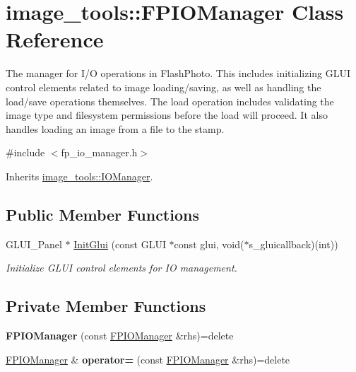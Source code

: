 \hypertarget{classimage__tools_1_1FPIOManager}{}\section{image\+\_\+tools\+:\+:F\+P\+I\+O\+Manager Class Reference}
\label{classimage__tools_1_1FPIOManager}


The manager for I/O operations in Flash\+Photo. This includes initializing G\+L\+UI control elements related to image loading/saving, as well as handling the load/save operations themselves. The load operation includes validating the image type and filesystem permissions before the load will proceed. It also handles loading an image from a file to the stamp.  




{\ttfamily \#include $<$fp\+\_\+io\+\_\+manager.\+h$>$}



Inherits \hyperlink{classimage__tools_1_1IOManager}{image\+\_\+tools\+::\+I\+O\+Manager}.

\subsection*{Public Member Functions}
\begin{DoxyCompactItemize}
\item 
G\+L\+U\+I\+\_\+\+Panel $\ast$ \hyperlink{classimage__tools_1_1FPIOManager_a813e5d68b47dcf703fbde9b4afa9aa8c}{Init\+Glui} (const G\+L\+UI $\ast$const glui, void($\ast$s\+\_\+gluicallback)(int))
\begin{DoxyCompactList}\small\item\em Initialize G\+L\+UI control elements for IO management. \end{DoxyCompactList}\end{DoxyCompactItemize}
\subsection*{Private Member Functions}
\begin{DoxyCompactItemize}
\item 
{\bfseries F\+P\+I\+O\+Manager} (const \hyperlink{classimage__tools_1_1FPIOManager}{F\+P\+I\+O\+Manager} \&rhs)=delete\hypertarget{classimage__tools_1_1FPIOManager_aa30c5ba2dc73be335b9607e05320eb27}{}\label{classimage__tools_1_1FPIOManager_aa30c5ba2dc73be335b9607e05320eb27}

\item 
\hyperlink{classimage__tools_1_1FPIOManager}{F\+P\+I\+O\+Manager} \& {\bfseries operator=} (const \hyperlink{classimage__tools_1_1FPIOManager}{F\+P\+I\+O\+Manager} \&rhs)=delete\hypertarget{classimage__tools_1_1FPIOManager_a0255096d3c12564d13c44d51aa0a817e}{}\label{classimage__tools_1_1FPIOManager_a0255096d3c12564d13c44d51aa0a817e}

\end{DoxyCompactItemize}

